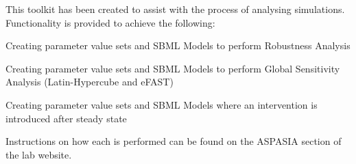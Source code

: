 This toolkit has been created to assist with the process of analysing simulations. Functionality is provided to achieve the following\+: 
\begin{DoxyItemize}
\item Creating parameter value sets and S\+B\+M\+L Models to perform Robustness Analysis 
\item Creating parameter value sets and S\+B\+M\+L Models to perform Global Sensitivity Analysis (Latin-\/\+Hypercube and e\+F\+A\+S\+T) 
\item Creating parameter value sets and S\+B\+M\+L Models where an intervention is introduced after steady state 
\end{DoxyItemize}

Instructions on how each is performed can be found on the A\+S\+P\+A\+S\+I\+A section of the lab website. 